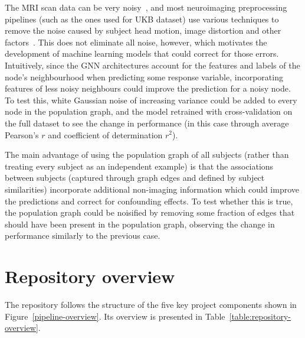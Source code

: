 The MRI scan data can be very noisy~\cite{pervaiz2020optimising,niu2019improved}, and most neuroimaging preprocessing pipelines (such as the ones used for UKB dataset) use various techniques to remove the noise caused by subject head motion, image distortion and other factors~\cite{glasser2013minimal}. This does not eliminate all noise, however, which motivates the development of machine learning models that could correct for those errors. Intuitively, since the GNN architectures account for the features and labels of the node's neighbourhood when predicting some response variable, incorporating features of less noisy neighbours could improve the prediction for a noisy node. To test this, white Gaussian noise of increasing variance could be added to every node in the population graph, and the model retrained with cross-validation on the full dataset to see the change in performance (in this case through average Pearson's $r$ and coefficient of determination $r^2$).

The main advantage of using the population graph of all subjects (rather than treating every subject as an independent example) is that the associations between subjects (captured through graph edges and defined by subject similarities) incorporate additional non-imaging information which could improve the predictions and correct for confounding effects. To test whether this is true, the population graph could be noisified by removing some fraction of edges that should have been present in the population graph, observing the change in performance similarly to the previous case. 


\section{Repository overview}

The repository follows the structure of the five key project components shown in Figure~\ref{pipeline-overview}. Its overview is presented in Table~\ref{table:repository-overview}.



